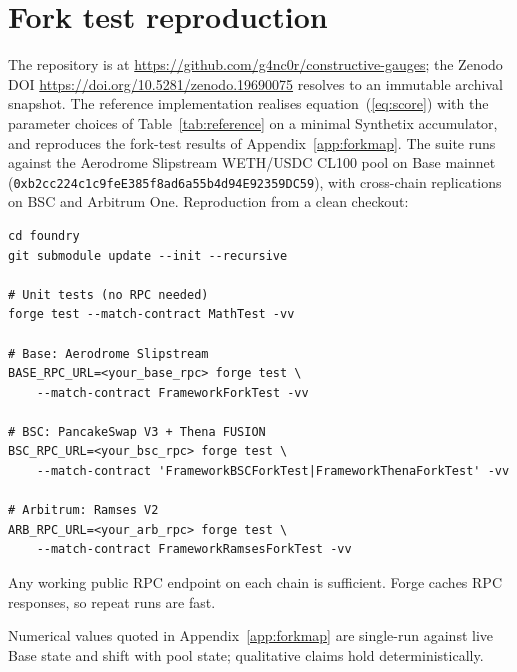 \documentclass[11pt,a4paper]{article}
\theoremstyle{definition}
\theoremstyle{plain}
\theoremstyle{remark}
\newenvironment{codeblock}{%
  \begin{mdframed}[%
    backgroundcolor=brown!3!white,%
    linewidth=0pt,%
    innertopmargin=6pt,%
    innerbottommargin=6pt,%
    innerleftmargin=12pt,%
    innerrightmargin=12pt,%
    leftmargin=0.075\linewidth,%
    rightmargin=0.075\linewidth,%
    skipabove=6pt,%
    skipbelow=6pt%
  ]\footnotesize%
}{%
  \end{mdframed}%
}
\begin{document}
\section{Fork test reproduction}\label{app:forktest}

The repository is at \url{https://github.com/g4nc0r/constructive-gauges}; the Zenodo DOI \url{https://doi.org/10.5281/zenodo.19690075} resolves to an immutable archival snapshot. The reference implementation realises equation~(\ref{eq:score}) with the parameter choices of Table~\ref{tab:reference} on a minimal Synthetix accumulator, and reproduces the fork-test results of Appendix~\ref{app:forkmap}. The suite runs against the Aerodrome Slipstream WETH/USDC CL100 pool on Base mainnet (\texttt{0xb2cc224c1c9feE385f8ad6a55b4d94E92359DC59}), with cross-chain replications on BSC and Arbitrum One. Reproduction from a clean checkout:

\begin{codeblock}\begin{verbatim}
cd foundry
git submodule update --init --recursive

# Unit tests (no RPC needed)
forge test --match-contract MathTest -vv

# Base: Aerodrome Slipstream
BASE_RPC_URL=<your_base_rpc> forge test \
    --match-contract FrameworkForkTest -vv

# BSC: PancakeSwap V3 + Thena FUSION
BSC_RPC_URL=<your_bsc_rpc> forge test \
    --match-contract 'FrameworkBSCForkTest|FrameworkThenaForkTest' -vv

# Arbitrum: Ramses V2
ARB_RPC_URL=<your_arb_rpc> forge test \
    --match-contract FrameworkRamsesForkTest -vv
\end{verbatim}\end{codeblock}

Any working public RPC endpoint on each chain is sufficient. Forge caches RPC responses, so repeat runs are fast.

Numerical values quoted in Appendix~\ref{app:forkmap} are single-run against live Base state and shift with pool state; qualitative claims hold deterministically.
\end{document}
